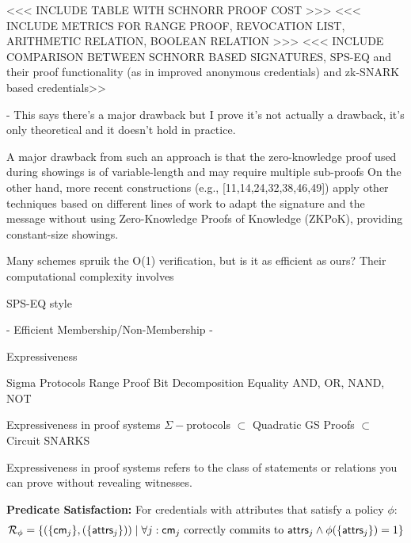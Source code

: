 <<< INCLUDE TABLE WITH SCHNORR PROOF COST >>>
<<< INCLUDE METRICS FOR RANGE PROOF, REVOCATION LIST, ARITHMETIC RELATION, BOOLEAN RELATION >>>
<<< INCLUDE COMPARISON BETWEEN SCHNORR BASED SIGNATURES, SPS-EQ and their proof functionality (as in improved anonymous credentials) and zk-SNARK based credentials>> 


- This says there's a major drawback but I prove it's not actually a drawback, it's only theoretical and it doesn't hold in practice.

    A major drawback from such an approach is that the zero-knowledge proof used during showings is of variable-length and may require multiple sub-proofs On the other hand, more recent constructions (e.g., [11,14,24,32,38,46,49]) apply other techniques based on different lines of work to adapt the signature and the message without using Zero-Knowledge Proofs of Knowledge (ZKPoK), providing constant-size showings.

Many schemes spruik the O(1) verification, but is it as efficient as ours? 
Their computational complexity involves 



SPS-EQ style

- Efficient Membership/Non-Membership
- 

Expressiveness 

Sigma Protocols
Range Proof
Bit Decomposition
Equality
AND, OR, NAND, NOT


Expressiveness in proof systems
$\Sigma-$protocols $\subset$ Quadratic GS Proofs $\subset$ Circuit SNARKS

Expressiveness in proof systems refers to the class of statements or relations you can prove without revealing witnesses. 
































\textbf{Predicate Satisfaction:} For credentials with attributes that satisfy a policy $\phi$:
    \[
    \mathcal{R}_{\phi} = \{(\{\mathsf{cm}_j\}, (\{\mathsf{attrs}_j\})) \mid \forall j: \mathsf{cm}_j \text{ correctly commits to } \mathsf{attrs}_j \wedge
    \phi(\{\mathsf{attrs}_j\}) = 1 \}
    \]
    
